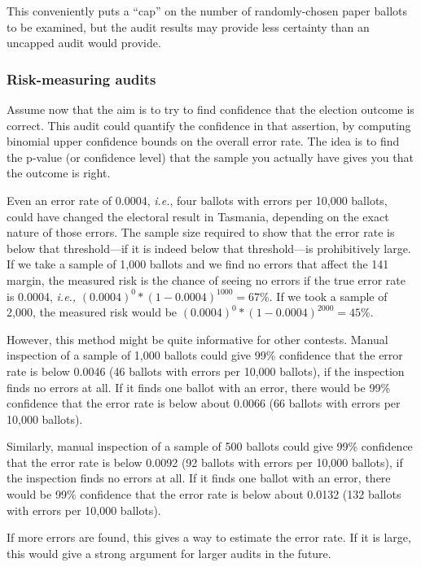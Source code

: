 \documentclass[10pt,a4paper]{article}
\begin{document}
This conveniently puts a ``cap'' on the number of randomly-chosen 
paper ballots to be examined, but 
the audit results may provide less certainty than an uncapped
audit would provide.

\subsubsection{Risk-measuring audits}

Assume now that the aim is to try to find confidence that the election outcome is correct.  This audit could quantify the confidence in that assertion, by computing binomial upper confidence bounds on the overall error rate.    The idea is to find the p-value (or confidence level) that the sample you actually have gives you that the outcome is right.


Even an error rate of 0.0004, {\it i.e.}, four ballots with errors per 10,000 ballots, could have changed the electoral result in Tasmania, depending on the exact nature of those errors. The sample size required to show that the error rate is below that threshold---if it is indeed below that threshold---is prohibitively large. 
If we take a sample of 1,000 ballots and we find no errors that affect the 141 margin, the measured risk is the chance of seeing no errors if the true error rate is 0.0004, {\it i.e.,} $(0.0004)^0 * (1-0.0004)^{1000} = 67\%.$
If we took a sample of 2,000, the measured risk would be $(0.0004)^0 * (1-0.0004)^{2000} = 45\%.$

However, this method might be quite informative for other contests.   Manual inspection of a sample of 1,000 ballots could give 99\% confidence that the error rate is below 0.0046 (46 ballots with errors per 10,000 ballots), if the inspection finds no errors at all. If it finds one ballot with an error, there would be 99\% confidence that the error rate is below about 0.0066 (66 ballots with errors per 10,000 ballots).

Similarly, manual inspection of a sample of 500 ballots could give 99\% confidence that the error rate is below 0.0092 (92 ballots with errors per 10,000 ballots), if the inspection finds no errors at all. If it finds one ballot with an error, there would be 99\% confidence that the error rate is below about 0.0132 (132 ballots with errors per 10,000 ballots).

If more errors are found, this gives a way to estimate the error rate.  If it is large, this would give a strong argument for larger audits in the future.
\end{document}
